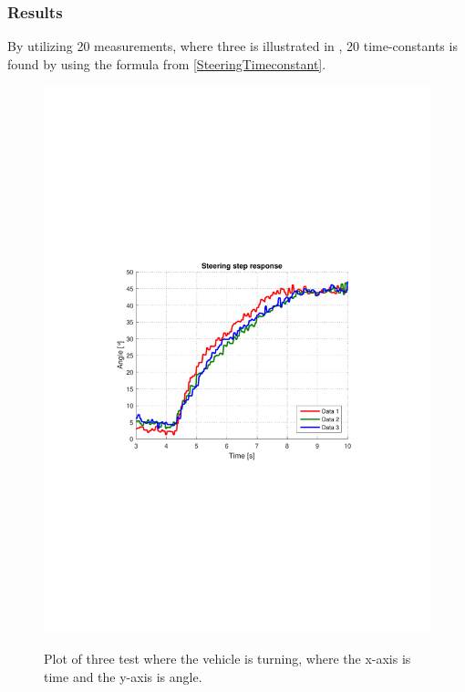 \subsubsection{Results}

By utilizing 20 measurements, where three is illustrated in , 20 time-constants is found by using the formula from \eqref{SteeringTimeconstant}.

\begin{figure}[H]
  \centering
  {
    \includegraphics[width=1.4\textwidth]{figures/steeringStep_P2.pdf}
  }
  \caption{Plot of three test where the vehicle is turning, where the x-axis is time and the y-axis is angle.}
  \label{steeringPlotSpeedVsGain}
\end{figure}
